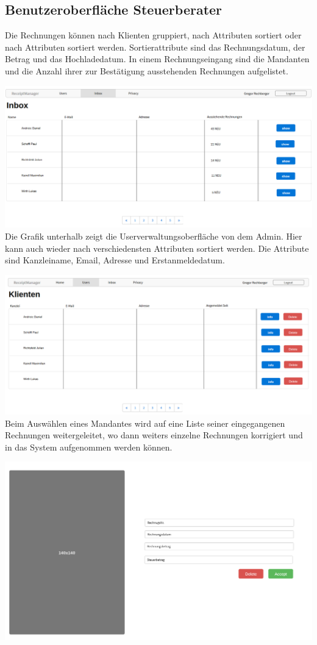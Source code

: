 \documentclass[12pt]{article}
\theoremstyle{definition}
\begin{document}
\subsection{Benutzeroberfläche Steuerberater}
Die Rechnungen können nach Klienten gruppiert, nach Attributen sortiert oder nach Attributen sortiert werden. Sortierattribute sind das Rechnungsdatum, der Betrag und das Hochladedatum. 
In einem Rechnungseingang sind die Mandanten und die Anzahl ihrer zur Bestätigung ausstehenden Rechnungen aufgelistet. \\
\par
\includegraphics[width=\linewidth]{inbox}
Die Grafik unterhalb zeigt die Userverwaltungsoberfläche von dem Admin. Hier kann auch wieder nach verschiedensten Attributen sortiert werden. Die Attribute sind Kanzleiname, Email, Adresse und Erstanmeldedatum.
\par
\includegraphics[width=\linewidth]{MandantenListeConcept}
\noindent Beim Auswählen eines Mandantes wird auf eine Liste seiner eingegangenen Rechnungen weitergeleitet, wo dann weiters einzelne Rechnungen korrigiert und in das System aufgenommen werden können.
\par

\includegraphics[width=\linewidth]{SingleReceiptReview}
\end{document}
